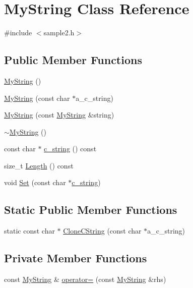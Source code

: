 \hypertarget{classMyString}{\section{\-My\-String \-Class \-Reference}
\label{d2/d2b/classMyString}
}


{\ttfamily \#include $<$sample2.\-h$>$}

\subsection*{\-Public \-Member \-Functions}
\begin{DoxyCompactItemize}
\item 
\hyperlink{classMyString_a8f9af468dfdce9f5d6420c88f9752a1d}{\-My\-String} ()
\item 
\hyperlink{classMyString_aae8bd9471dc1c5a2620f541ed8ec4a05}{\-My\-String} (const char $\ast$a\-\_\-c\-\_\-string)
\item 
\hyperlink{classMyString_a5c1c02fe1fbba33276551c78946e6c81}{\-My\-String} (const \hyperlink{classMyString}{\-My\-String} \&string)
\item 
\hyperlink{classMyString_ac80446cc8d838f41aae5e030a1ab477f}{$\sim$\-My\-String} ()
\item 
const char $\ast$ \hyperlink{classMyString_ac6ca59d626468e2046b615d1d2ef62b9}{c\-\_\-string} () const 
\item 
size\-\_\-t \hyperlink{classMyString_a8dea62c9a8351f2d5024be715ab3f8ae}{\-Length} () const 
\item 
void \hyperlink{classMyString_a8a16a47ddf93ff4ffcabd4ee4ba55baf}{\-Set} (const char $\ast$\hyperlink{classMyString_ac6ca59d626468e2046b615d1d2ef62b9}{c\-\_\-string})
\end{DoxyCompactItemize}
\subsection*{\-Static \-Public \-Member \-Functions}
\begin{DoxyCompactItemize}
\item 
static const char $\ast$ \hyperlink{classMyString_ab2d97c7a2ef52b345237a6ce85480677}{\-Clone\-C\-String} (const char $\ast$a\-\_\-c\-\_\-string)
\end{DoxyCompactItemize}
\subsection*{\-Private \-Member \-Functions}
\begin{DoxyCompactItemize}
\item 
const \hyperlink{classMyString}{\-My\-String} \& \hyperlink{classMyString_a0a2fd8c76f308706c3e0faab850cc39f}{operator=} (const \hyperlink{classMyString}{\-My\-String} \&rhs)
\end{DoxyCompactItemize}
